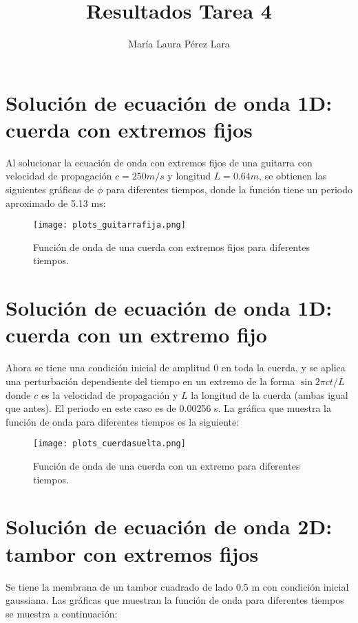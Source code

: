 \documentclass[a4paper,10pt]{article}
\begin{document}
\title{Resultados Tarea 4}

\author{María Laura Pérez Lara}

\maketitle
\section{Solución de ecuación de onda 1D: cuerda con extremos fijos}

Al solucionar la ecuación de onda con extremos fijos de una guitarra con velocidad de propagación $c=250 m/s$ y longitud $L=0.64m$, se obtienen las siguientes gráficas de $\phi$ para diferentes tiempos, donde la función tiene un periodo aproximado de 5.13 ms:

\begin{figure}[H]
    \centering
    \texttt{[image: plots\_guitarrafija.png]}
    \caption{Función de onda de una cuerda con extremos fijos para diferentes tiempos.}
\end{figure}

\section{Solución de ecuación de onda 1D: cuerda con un extremo fijo}

Ahora se tiene una condición inicial de amplitud 0 en toda la cuerda, y se aplica una perturbación dependiente del tiempo en un extremo de la forma $\sin{2\pi ct/L}$ donde $c$ es la velocidad de propagación y $L$ la longitud de la cuerda (ambas igual que antes). El periodo en este caso es de 0.00256 s. La gráfica que muestra la función de onda para diferentes tiempos es la siguiente:

\begin{figure}[H]
    \centering
    \texttt{[image: plots\_cuerdasuelta.png]}
    \caption{Función de onda de una cuerda con un extremo para diferentes tiempos.}
\end{figure}

\section{Solución de ecuación de onda 2D: tambor con extremos fijos}

Se tiene la membrana de un tambor cuadrado de lado 0.5 m con condición inicial gaussiana. Las gráficas que muestran la función de onda para diferentes tiempos se muestra a continuación:
\end{document}
